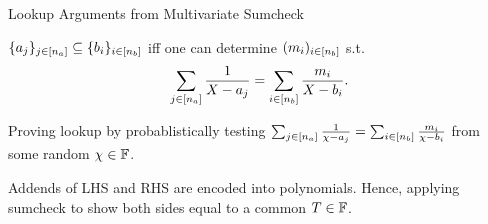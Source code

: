 \begin{frame}{Lookup Arguments from Multivariate Sumcheck}
	\begin{lemma}
		$\{a_j\}_{j \in [{n_a}]} \subseteq \{b_i\}_{i \in [{n_b}]}$ iff one can determine $(m_i)_{i \in [{n_b}]}$ s.t.
		\begin{equation*}
			\sum_{j \in [{n_a}]}\frac{1}{X - a_j} = \sum_{i \in [{n_b}]}\frac{m_i}{X - b_i}.
		\end{equation*}
	\end{lemma}
	
	Proving lookup by probablistically testing $\sum_{j \in [{n_a}]}\frac{1}{\chi - a_j} = \sum_{i \in [{n_b}]}\frac{m_i}{\chi - b_i}$ from some random $\chi \in \mathbb{F}$.
	
	Addends of LHS and RHS are encoded into polynomials. Hence, applying sumcheck to show both sides equal to a common $T \in \mathbb{F}$.
\end{frame}
